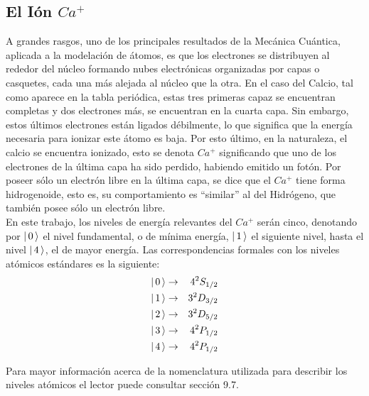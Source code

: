 \subsection{El I\'on $Ca^{+}$}\label{ionca}
 \quad A grandes rasgos, uno de los principales resultados de la Mec\'anica Cu\'antica, aplicada a la modelaci\'on de \'atomos, es que los electrones se distribuyen al rededor del n\'ucleo formando nubes electr\'onicas organizadas por capas o casquetes, cada una m\'as alejada al n\'ucleo que la otra. En el caso del Calcio, tal como aparece en la tabla peri\'odica, estas tres primeras capaz se encuentran completas y dos electrones m\'as, se encuentran en la cuarta capa. Sin embargo, estos \'ultimos electrones est\'an ligados d\'ebilmente, lo que significa que la energ\'ia necesaria para ionizar este \'atomo es baja. Por esto \'ultimo, en la naturaleza, el calcio se encuentra ionizado, esto se denota $Ca^+$ significando que uno de los electrones de la \'ultima capa ha sido perdido, habiendo emitido un fot\'on. Por poseer s\'olo un electr\'on libre en la \'ultima capa, se dice que el $Ca^+$ tiene forma hidrogenoide, esto es, su comportamiento es ``similar'' al del Hidr\'ogeno, que tambi\'en posee s\'olo un electr\'on libre.\\

\quad En este trabajo, los niveles de energ\'ia relevantes del $Ca^+$ ser\'an cinco, denotando por $\vert\, 0 \,\rangle$ el nivel fundamental, o de m\'inima energ\'ia, $\vert\, 1 \,\rangle$ el siguiente nivel, hasta el nivel $\vert\, 4 \,\rangle$, el de mayor energ\'ia. Las correspondencias formales con los niveles at\'omicos est\'andares es la siguiente:
\begin{eqnarray*}
\vert\, 0 \,\rangle&\rightarrow& 4^2S_{1/2}\\
\vert\, 1 \,\rangle&\rightarrow& 3^2D_{3/2}\\
\vert\, 2 \,\rangle&\rightarrow& 3^2D_{5/2}\\
\vert\, 3 \,\rangle&\rightarrow& 4^2P_{1/2}\\
\vert\, 4 \,\rangle&\rightarrow& 4^2P_{1/2}
\end{eqnarray*}

\quad Para mayor informaci\'on acerca de la nomenclatura utilizada para describir los niveles at\'omicos el lector puede consultar \cite{eisberg} secci\'on 9.7.\\

